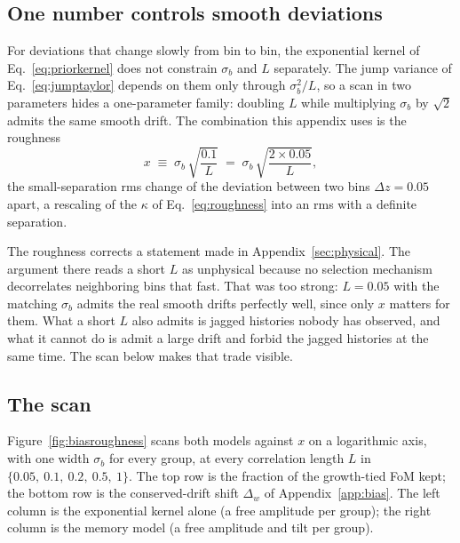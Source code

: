 \documentclass[11pt]{article}
\begin{document}
\subsection{One number controls smooth deviations}
\label{sec:roughnessdef}

For deviations that change slowly from bin to bin, the exponential
kernel of Eq.~\eqref{eq:priorkernel} does not constrain $\sigma_b$
and $L$ separately.  The jump variance of Eq.~\eqref{eq:jumptaylor}
depends on them only through $\sigma_b^2/L$, so a scan in two
parameters hides a one-parameter family: doubling $L$ while
multiplying $\sigma_b$ by $\sqrt{2}$ admits the same smooth drift.
The combination this appendix uses is the roughness
\begin{equation}
  x \;\equiv\; \sigma_b\,\sqrt{\frac{0.1}{L}}
  \;=\;
  \sigma_b\,\sqrt{\frac{2 \times 0.05}{L}} ,
  \label{eq:roughx}
\end{equation}
the small-separation rms change of the deviation between two bins
$\Delta z = 0.05$ apart, a rescaling of the $\kappa$ of
Eq.~\eqref{eq:roughness} into an rms with a definite separation.

The roughness corrects a statement made in
Appendix~\ref{sec:physical}.  The argument there reads a short $L$
as unphysical because no selection mechanism decorrelates neighboring
bins that fast.  That was too strong: $L = 0.05$ with the matching
$\sigma_b$ admits the real smooth drifts perfectly well, since only
$x$ matters for them.  What a short $L$ also admits is jagged
histories nobody has observed, and what it cannot do is admit a large
drift and forbid the jagged histories at the same time.  The scan
below makes that trade visible.

\subsection{The scan}
\label{sec:roughnessscan}

Figure~\ref{fig:biasroughness} scans both models against $x$ on a
logarithmic axis, with one width $\sigma_b$ for every group, at every
correlation length $L$ in $\{0.05,\ 0.1,\ 0.2,\ 0.5,\ 1\}$.
The top row is the fraction of the growth-tied FoM kept;
the bottom row is the conserved-drift shift $\Delta_w$ of
Appendix~\ref{app:bias}.  The left column is the exponential kernel
alone (a free amplitude per group); the right column is the memory
model (a free amplitude and tilt per group).
\end{document}
